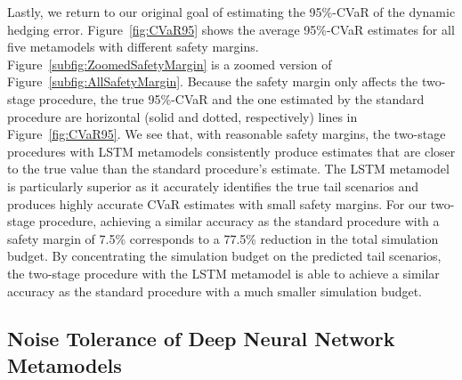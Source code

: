 \documentclass{article}
\begin{document}
Lastly, we return to our original goal of estimating the 95\%-CVaR of the dynamic hedging error.
Figure~\ref{fig:CVaR95} shows the average 95\%-CVaR estimates for all five metamodels with different safety margins.
Figure~\ref{subfig:ZoomedSafetyMargin} is a zoomed version of Figure~\ref{subfig:AllSafetyMargin}.
Because the safety margin only affects the two-stage procedure, the true 95\%-CVaR and the one estimated by the standard procedure are horizontal (solid and dotted, respectively) lines in Figure~\ref{fig:CVaR95}.
We see that, with reasonable safety margins, the two-stage procedures with LSTM metamodels consistently produce estimates that are closer to the true value than the standard procedure's estimate.
The LSTM metamodel is particularly superior as it accurately identifies the true tail scenarios and produces highly accurate CVaR estimates with small safety margins.
For our two-stage procedure, achieving a similar accuracy as the standard procedure with a safety margin of 7.5\% corresponds to a 77.5\% reduction in the total simulation budget.
By concentrating the simulation budget on the predicted tail scenarios, the two-stage procedure with the LSTM metamodel is able to achieve a similar accuracy as the standard procedure with a much smaller simulation budget.

\subsection{Noise Tolerance of Deep Neural Network Metamodels}
\end{document}
